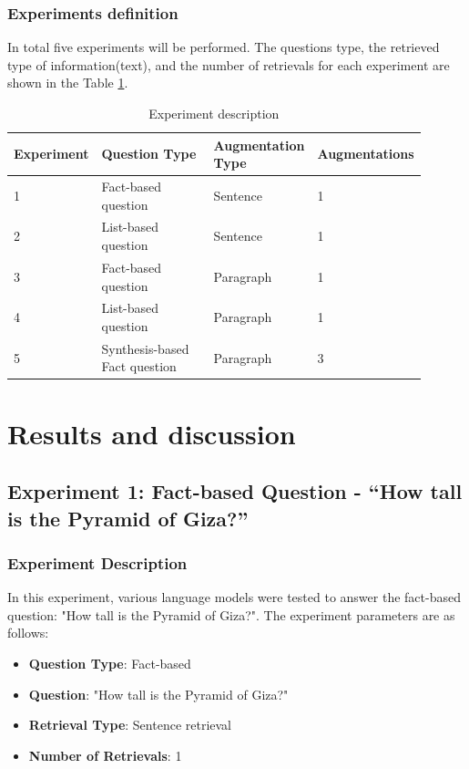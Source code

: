\documentclass{wseas}
\begin{document}
\subsubsection{Experiments definition}


In total five experiments will be performed. The questions type, the retrieved type of information(text), 
and the number of retrievals for each experiment are shown in the Table \ref{tab:experiment_questions_table}. 

\begin{table}[htbp]
  \caption{Experiment description} 
  \label{tab:experiment_questions_table}
    \centering
      \begin{tabular} {|p{0.15\linewidth}|p{0.35\linewidth}|p{0.25\linewidth}|p{0.15\linewidth}|}
        \hline
        \textbf{Experiment} & \textbf{Question Type} & \textbf{Augmentation Type} & \textbf{Augmentations} \\ \hline
        1 & Fact-based question & Sentence & 1 \\ \hline
        2 & List-based question & Sentence & 1 \\ \hline
        3 & Fact-based question & Paragraph & 1 \\ \hline
        4 & List-based question & Paragraph & 1 \\ \hline
        5 & Synthesis-based Fact question & Paragraph & 3 \\ \hline
      \end{tabular}
\end{table}

    

\section{Results and discussion}

\subsection{Experiment 1: Fact-based Question - ``How tall is the
Pyramid of
Giza?''}

\subsubsection{Experiment Description}
In this experiment, various language models were tested to answer the
fact-based question: "How tall is the Pyramid of Giza?". The
experiment parameters are as follows:

\begin{itemize}
\item
  \textbf{Question Type}: Fact-based
\item
  \textbf{Question}: "How tall is the Pyramid of Giza?"
\item
  \textbf{Retrieval Type}: Sentence retrieval
\item
  \textbf{Number of Retrievals}: 1
\end{itemize}
\end{document}
